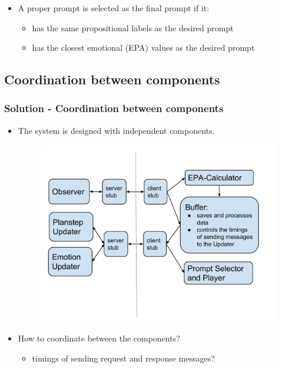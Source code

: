 \documentclass{beamer}
\begin{document}
\begin{frame}
\begin{itemize}
\begin{figure}[htb]
\begin{subfigure}[b]{.4\textwidth}
\end{subfigure}
\end{figure}
\pause
\item A proper prompt is selected as the final prompt if it:
\begin{itemize}
\item has the same propositional labels as the desired prompt
\item has the closest emotional (EPA) values as the desired prompt
\end{itemize}
\end{itemize}
\end{frame}

\subsection{Coordination between components}

\begin{frame}
\frametitle{Solution - Coordination between components}
\begin{itemize}
\item The system is designed with independent components.
\begin{figure}
\centering
\includegraphics[trim = 5mm 35mm 5mm 20mm, clip, width=.8\linewidth]{fig/fig-system-overview.pdf}
\end{figure}
\item How to coordinate between the components?
\begin{itemize}
\item timings of sending request and response messages?
\end{itemize}
\end{itemize}
\end{frame}
\end{document}
